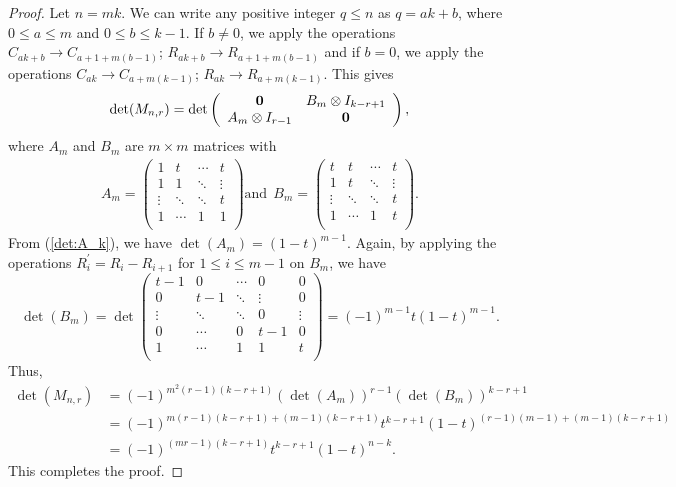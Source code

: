 \documentclass[12pt]{article}
\begin{document}
\begin{proof}
Let $n=mk$. We can write any positive integer $q \leq n$ as $q=ak+b$, where $0 \leq a \leq m$ and $ 0 \leq b \leq k-1$. If $b \neq 0$, we apply the operations $C_{ak+b}\rightarrow C_{a+1+m(b-1)}$; $R_{ak+b}\rightarrow R_{a+1+m(b-1)}$ and if $b=0$, we apply the operations $C_{ak}\rightarrow C_{a+m(k-1)}$; $R_{ak}\rightarrow R_{a+m(k-1)}$. This gives
\begin{align*}
\det(M_{n,r})=\det\left(
 	\begin{array}{cc}
 	\bf{0} & B_m \otimes I_{k-r+1}  \\
         A_m \otimes I_{r-1} & \bf{0} 
 	\end{array} 
 	\right),
  \end{align*}
where $A_m$ and $B_m$ are $m \times m$ matrices with
\begin{align*}
   A_m= \left(
 	\begin{array}{cccc}
 	1 & t &  \cdots & t \\
 	1 & 1 &  \ddots & \vdots \\
 	\vdots & \ddots & \ddots & t \\
 	1 & \cdots & 1 & 1 \\
 	\end{array}
 	\right)\text{and}~~ 
  B_m= \left(
 	\begin{array}{cccc}
 	t & t &  \cdots & t \\
 	1 & t &  \ddots & \vdots \\
 	\vdots & \ddots & \ddots & t \\
 	1 & \cdots & 1 & t \\
 	\end{array}
 	\right).
\end{align*}
 From (\ref{det:A_k}), we have $\det(A_m)=(1-t)^{m-1}$. Again, by applying the operations $R_i^\prime=R_i-R_{i+1}$ for $1\leq i\leq m-1$ on $B_m$, we have
$$\det(B_m)=\det \left(
 	\begin{array}{ccccc}
 	t-1 & 0 &   \cdots & 0 & 0 \\
 	0 & t-1 &  \ddots & \vdots & 0 \\
 	\vdots & \ddots & \ddots & 0 & \vdots\\
        0 & \cdots & 0 & t-1 & 0 \\
 	1 & \cdots & 1 & 1 & t \\
 	\end{array}
 	\right)=(-1)^{m-1}t(1-t)^{m-1}.$$ 
  Thus, 
  \begin{align*}
  \det (M_{n,r}) & =(-1)^{m^2(r-1)(k-r+1)}(\det(A_m))^{r-1}(\det(B_m))^{k-r+1} \\
  & =(-1)^{m(r-1)(k-r+1)+(m-1)(k-r+1)}t^{k-r+1} (1-t)^{(r-1)(m-1)+(m-1)(k-r+1)} \\
 & =(-1)^{(mr-1)(k-r+1)} t^{k-r+1} (1-t)^{n-k}.
  \end{align*}
  This completes the proof.
\end{proof}
\end{document}
